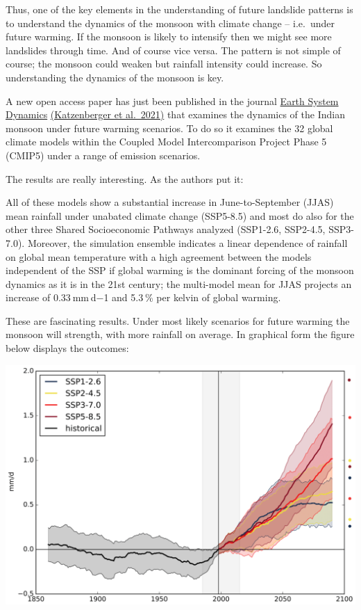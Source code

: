 \documentclass[
]{book}
\begin{document}
Thus, one of the key elements in the understanding of future landslide patterns is to understand the dynamics of the monsoon with climate change -- i.e.~under future warming. If the monsoon is likely to intensify then we might see more landslides through time. And of course vice versa. The pattern is not simple of course; the monsoon could weaken but rainfall intensity could increase. So understanding the dynamics of the monsoon is key.

A new open access paper has just been published in the journal \href{https://www.earth-system-dynamics.net/}{Earth System Dynamics} \href{https://esd.copernicus.org/articles/12/367/2021/}{(Katzenberger et al.~2021)} that examines the dynamics of the Indian monsoon under future warming scenarios. To do so it examines the 32 global climate models within the Coupled Model Intercomparison Project Phase 5 (CMIP5) under a range of emission scenarios.

The results are really interesting. As the authors put it:

All of these models show a substantial increase in June-to-September (JJAS) mean rainfall under unabated climate change (SSP5-8.5) and most do also for the other three Shared Socioeconomic Pathways analyzed (SSP1-2.6, SSP2-4.5, SSP3-7.0). Moreover, the simulation ensemble indicates a linear dependence of rainfall on global mean temperature with a high agreement between the models independent of the SSP if global warming is the dominant forcing of the monsoon dynamics as it is in the 21st century; the multi-model mean for JJAS projects an increase of 0.33 mm d−1 and 5.3 \% per kelvin of global warming.

These are fascinating results. Under most likely scenarios for future warming the monsoon will strength, with more rainfall on average. In graphical form the figure below displays the outcomes:

\includegraphics{fig/petley_monsoon.png}
\end{document}
